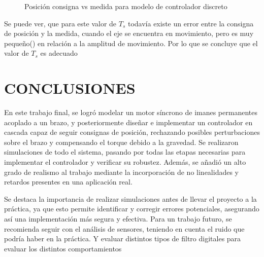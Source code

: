 \documentclass[a4paper, 10pt, onecolumn,journal]{ieeeconf}
\begin{document}
\begin{figure}[H]
	\centering
	\begin{adjustbox}{max width=\columnwidth}
	\end{adjustbox}
	\caption{Posición consigna vs medida para modelo de controlador discreto}
	\label{Posición consigna vs medida para modelo de controlador discreto}
\end{figure}
Se puede ver, que para este valor de $T_s$ todavía existe un error entre la consigna de posición y la medida, cuando el eje se encuentra en movimiento, pero es muy pequeño() en relación a la amplitud de movimiento. Por lo que se concluye que el valor de $T_s$ es adecuado 
\section{CONCLUSIONES}
En este trabajo final, se logró modelar un motor síncrono de imanes permanentes acoplado a un brazo, y posteriormente diseñar e implementar un controlador en cascada capaz de seguir consignas de posición, rechazando posibles perturbaciones sobre el brazo y compensando el torque debido a la gravedad. Se realizaron simulaciones de todo el sistema, pasando por todas las etapas necesarias para implementar el controlador y verificar su robustez. Además, se añadió un alto grado de realismo al trabajo mediante la incorporación de no linealidades y retardos presentes en una aplicación real.

Se destaca la importancia de realizar simulaciones antes de llevar el proyecto a la práctica, ya que esto permite identificar y corregir errores potenciales, asegurando así una implementación más segura y efectiva.
Para un trabajo futuro, se recomienda seguir con el análisis de sensores, teniendo en cuenta el ruido que podría haber en la práctica. Y evaluar distintos tipos de filtro digitales para evaluar los distintos comportamientos
\end{document}
